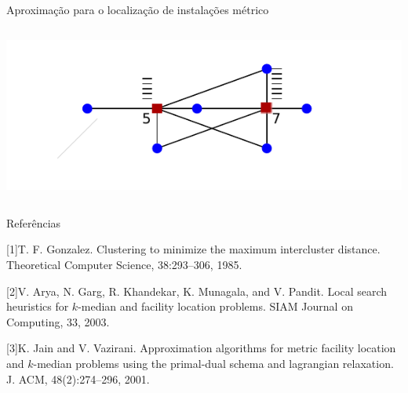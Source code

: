 \documentclass[final]{beamer}
\begin{document}
\begin{frame}[t]
\begin{columns}[t]
\begin{column}{0.48\paperwidth}
\begin{block}{Aproximação para o localização de instalações métrico}
\begin{columns}
\begin{column}{0.23\paperwidth}
          \begin{tcolorbox}
            \vspace{-1cm}\hspace{-2.3cm}\includegraphics[scale=1.9]{imgs/fl4.pdf}\vspace{-1cm}
          \end{tcolorbox}
        \end{column}
      \end{columns}

    \end{block}
    \begin{block}{Referências}
      
      
      [1]T. F. Gonzalez. Clustering to minimize the maximum intercluster distance.
      Theoretical Computer Science, 38:293–306, 1985.
      
      [2]V. Arya, N. Garg, R. Khandekar, K. Munagala, and V. Pandit. Local search heuristics for $k$-median and facility location problems. SIAM
      Journal on Computing, 33, 2003.
      
      [3]K. Jain and V. Vazirani. Approximation algorithms for metric facility location and $k$-median problems using the primal-dual schema and lagrangian
      relaxation. J. ACM, 48(2):274–296, 2001.
    \end{block}
  \end{column}
\end{columns}

\end{frame}
\end{document}
